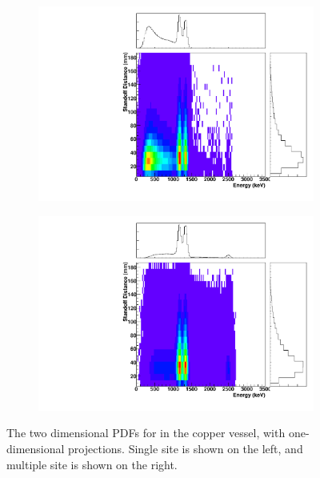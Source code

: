 \documentclass[herrin-thesis.tex]{subfiles}
\begin{document}
\begin{figure}[hp]
\centering
	\begin{subfigure}[b]{0.35\textwidth}
	\centering
	\includegraphics[width=\textwidth]{./plots/PDFs/analysis_pdf_AllVessel_Co60_ss.pdf}
\end{subfigure}\hspace{0.1\textwidth}%
\begin{subfigure}[b]{0.35\textwidth}
	\centering
	\includegraphics[width=1\textwidth]{./plots/PDFs/analysis_pdf_AllVessel_Co60_ms.pdf}
	\end{subfigure}
\caption[PDF for  in the TPC vessel]{The two dimensional PDFs for  in the copper vessel, with one-dimensional projections. Single site is shown on the left, and multiple site is shown on the right.}
\label{fig:analysis_pdf_AllVessel_Co60}
\end{figure}
\end{document}
